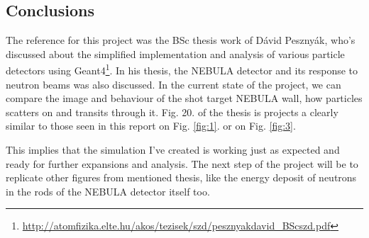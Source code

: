 \begin{multicols}{2}
\section{Conclusions} \label{sec:5}
The reference for this project was the BSc thesis work of Dávid Pesznyák, who's discussed about the simplified implementation and analysis of various particle detectors using Geant4\footnote{\url{http://atomfizika.elte.hu/akos/tezisek/szd/pesznyakdavid_BScszd.pdf}}. In his thesis, the NEBULA detector and its response to neutron beams was also discussed. In the current state of the project, we can compare the image and behaviour of the shot target NEBULA wall, how particles scatters on and transits through it. Fig. 20. of the thesis is projects a clearly similar to those seen in this report on Fig. \ref{fig:1}. or on Fig. \ref{fig:3}.

This implies that the simulation I've created is working just as expected and ready for further expansions and analysis. The next step of the project will be to replicate other figures from mentioned thesis, like the energy deposit of neutrons in the rods of the NEBULA detector itself too.

\end{multicols}